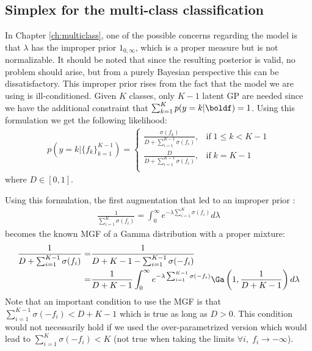 \subsection{Simplex for the multi-class classification}
\label{sec:simplex}
In Chapter \ref{ch:multiclass}, one of the possible concerns regarding the model is that $\lambda$ has the improper prior $1_{0,\infty}$, which is a proper measure but is not normalizable.
It should be noted that since the resulting posterior is valid, no problem should arise, but from a purely Bayesian perspective this can be dissatisfactory.
This improper prior rises from the fact that the model we are using is ill-conditioned.
Given $K$ classes, only $K-1$ latent \ac{GP} are needed since we have the additional constraint that $\sum_{k=1}^K p(y=k|\boldf) = 1$.
Using this formulation we get the following likelihood:
\begin{align}
    p(y=k|\{f_k\}_{k=1}^{K-1}) = \left\{
        \begin{array}{cc}
            \frac{\sigma(f_k)}{D + \sum_{i=1}^{K-1}\sigma(f_i)}, & \mathrm{if}\; 1 \leq k < K - 1\\
            \frac{D}{D + \sum_{i=1}^{K-1}\sigma(f_i)}, & \mathrm{if}\; k = K - 1 \\
    \end{array}
    \right.
\end{align}
where $D \in [0, 1]$.

Using this formulation, the first augmentation that led to an improper prior :
\begin{align*}
    \frac{1}{ \sum_{i=1}^{K} \sigma(f_i)} = \int_0^\infty e^{-\lambda  \sum_{i=1}^{K} \sigma(f_i)}d\lambda
\end{align*}
becomes the known \ac{MGF} of a Gamma distribution with a proper mixture:
\begin{align*}
    \frac{1}{D + \sum_{i=1}^{K-1} \sigma(f_i)} =& \frac{1}{D + K - 1 - \sum_{i=1}^{K-1} \sigma(-f_i)}\\
    =& \frac{1}{D + K - 1}\int_0^\infty e^{-\lambda \sum_{i=1}^{K-1} \sigma(-f_i)}\Ga \left(1, \frac{1}{D + K - 1}\right)d\lambda
\end{align*}
Note that an important condition to use the \ac{MGF} is that $\sum_{i=1}^{K-1} \sigma(-f_i) < D + K - 1$ which is true as long as $D > 0$.
This condition would not necessarily hold if we used the over-parametrized version which would lead to $\sum_{i=1}^{K} \sigma(-f_i) < K$ (not true when taking the limits $\forall i,\;f_i \rightarrow -\infty$).

